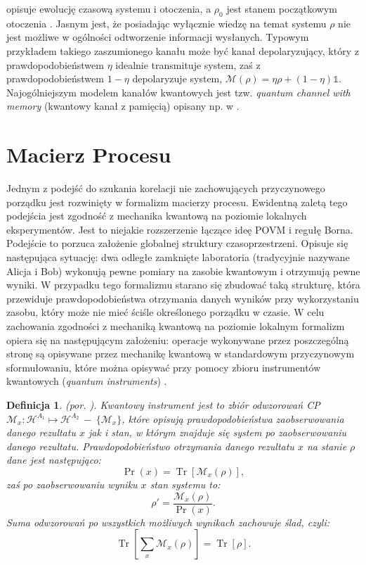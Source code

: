 \documentclass[10pt]{article} %
\newtheorem{definicja}{Definicja}
\DeclareMathOperator{\Trs}{Tr}
\newcommand{\Hx}[1]{\mathcal{H}^{#1}}
\newcommand{\I}{\mathbb{1}}
\begin{document}
opisuje ewolucję czasową systemu i otoczenia, a $\rho_0$ jest stanem początkowym otoczenia \cite{fund}. Jasnym jest, że posiadając wyłącznie wiedzę na temat systemu $\rho$ nie jest możliwe w ogólności odtworzenie informacji wysłanych.
Typowym przykładem takiego zaszumionego kanału może być kanał depolaryzujący, który z prawdopodobieństwem $\eta$ idealnie transmituje system, zaś z prawdopodobieństwem $1-\eta$ depolaryzuje system, $\mathcal{M}(\rho) = \eta\rho+(1-\eta)\I$. Najogólniejszym modelem kanałów kwantowych jest tzw.
\textit{quantum channel with memory} (kwantowy kanał z pamięcią) opisany np. w \cite{memory}.

\section{Macierz Procesu}
\label{macierz_procesu}
Jednym z podejść do szukania korelacji nie zachowujących przyczynowego porządku jest rozwinięty w \cite{process_matrix} formalizm macierzy procesu.
Ewidentną zaletą tego podejścia jest zgodność z mechanika kwantową na poziomie lokalnych eksperymentów. Jest to niejakie rozszerzenie łączące ideę POVM i regułę Borna. Podejście to porzuca założenie globalnej struktury czasoprzestrzeni. Opisuje się następująca sytuację: dwa odległe zamknięte laboratoria (tradycyjnie nazywane Alicja i Bob) wykonują pewne pomiary na zasobie kwantowym i otrzymują pewne wyniki. W przypadku tego formalizmu starano się zbudować taką strukturę, która przewiduje prawdopodobieństwa otrzymania danych wyników przy wykorzystaniu zasobu, który może nie mieć ściśle określonego porządku w czasie. W celu zachowania zgodności z mechaniką kwantową na poziomie lokalnym formalizm opiera się na następującym założeniu: operacje wykonywane przez poszczególną stronę są opisywane przez mechanikę kwantową w standardowym przyczynowym sformułowaniu, które można opisywać przy pomocy zbioru instrumentów kwantowych (\textit{quantum instruments}) \cite{quantum_instrument}. 
\begin{definicja}
(por. \cite{quantum_instrument}).
Kwantowy instrument jest to zbiór odwzorowań CP $\mathcal{M}_x: \Hx{A_1}\mapsto \Hx{A_2} ~-~ \{\mathcal{M}_x\}$, które opisują prawdopodobieństwa zaobserwowania danego rezultatu $x$ jak i stan, w którym znajduje się system po zaobserwowaniu danego rezultatu. Prawdopodobieństwo otrzymania danego rezultatu $x$ na stanie $\rho$ dane jest następująco:
\begin{equation}
\Pr(x) = \Trs\left[\mathcal{M}_x(\rho)\right],
\end{equation} zaś po zaobserwowaniu wyniku $x$ stan systemu to:
\begin{equation}
\rho' = \frac{\mathcal{M}_x(\rho)}{\Pr(x)}.
\end{equation} Suma odwzorowań po wszystkich możliwych wynikach zachowuje ślad, czyli:
\begin{equation}
\Trs \left[ \sum_x \mathcal{M}_x(\rho) \right] = \Trs\left[\rho\right].
\end{equation}
\end{definicja}
\end{document}
